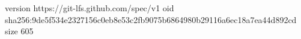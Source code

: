 version https://git-lfs.github.com/spec/v1
oid sha256:9de5f534e2327156c0eb8e53c2fb9075b6864980b29116a6ec18a7ea44d892cd
size 605
